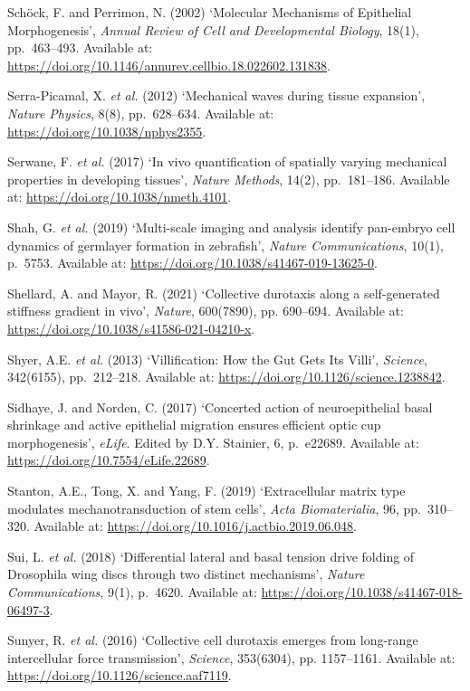\documentclass[
]{article}
\begin{document}
Schöck, F. and Perrimon, N. (2002) `Molecular Mechanisms of Epithelial
Morphogenesis', \emph{Annual Review of Cell and Developmental Biology},
18(1), pp.~463--493. Available at:
\url{https://doi.org/10.1146/annurev.cellbio.18.022602.131838}.

Serra-Picamal, X. \emph{et al.} (2012) `Mechanical waves during tissue
expansion', \emph{Nature Physics}, 8(8), pp.~628--634. Available at:
\url{https://doi.org/10.1038/nphys2355}.

Serwane, F. \emph{et al.} (2017) `In vivo quantification of spatially
varying mechanical properties in developing tissues', \emph{Nature
Methods}, 14(2), pp.~181--186. Available at:
\url{https://doi.org/10.1038/nmeth.4101}.

Shah, G. \emph{et al.} (2019) `Multi-scale imaging and analysis identify
pan-embryo cell dynamics of germlayer formation in zebrafish',
\emph{Nature Communications}, 10(1), p.~5753. Available at:
\url{https://doi.org/10.1038/s41467-019-13625-0}.

Shellard, A. and Mayor, R. (2021) `Collective durotaxis along a
self-generated stiffness gradient in vivo', \emph{Nature}, 600(7890),
pp. 690--694. Available at:
\url{https://doi.org/10.1038/s41586-021-04210-x}.

Shyer, A.E. \emph{et al.} (2013) `Villification: How the Gut Gets Its
Villi', \emph{Science}, 342(6155), pp.~212--218. Available at:
\url{https://doi.org/10.1126/science.1238842}.

Sidhaye, J. and Norden, C. (2017) `Concerted action of neuroepithelial
basal shrinkage and active epithelial migration ensures efficient optic
cup morphogenesis', \emph{eLife}. Edited by D.Y. Stainier, 6, p.~e22689.
Available at: \url{https://doi.org/10.7554/eLife.22689}.

Stanton, A.E., Tong, X. and Yang, F. (2019) `Extracellular matrix type
modulates mechanotransduction of stem cells', \emph{Acta Biomaterialia},
96, pp.~310--320. Available at:
\url{https://doi.org/10.1016/j.actbio.2019.06.048}.

Sui, L. \emph{et al.} (2018) `Differential lateral and basal tension
drive folding of Drosophila wing discs through two distinct mechanisms',
\emph{Nature Communications}, 9(1), p.~4620. Available at:
\url{https://doi.org/10.1038/s41467-018-06497-3}.

Sunyer, R. \emph{et al.} (2016) `Collective cell durotaxis emerges from
long-range intercellular force transmission', \emph{Science}, 353(6304),
pp. 1157--1161. Available at:
\url{https://doi.org/10.1126/science.aaf7119}.
\end{document}
